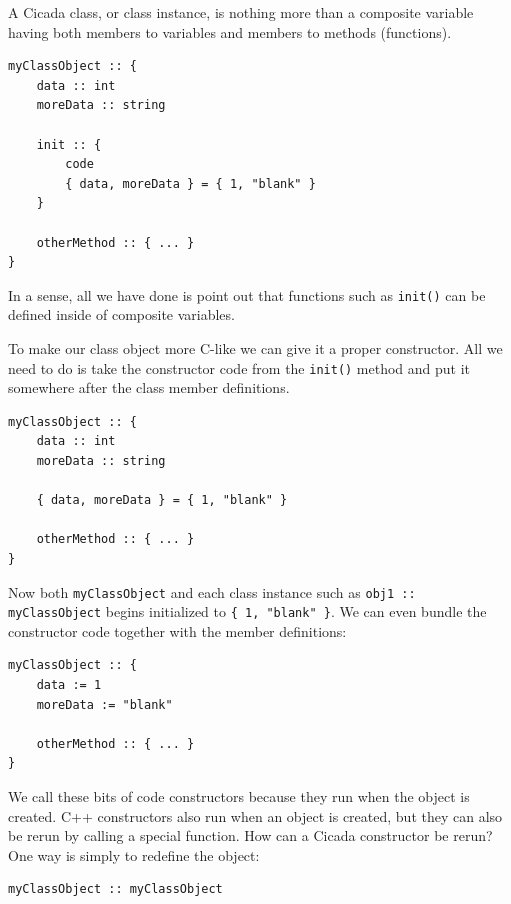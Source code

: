 \documentclass{article}
\newenvironment{code}{
       \begin{list}{}{
               \setlength{\leftmargin}{.4in}
               \setlength{\rightmargin}{0in}
               \setlength{\topsep}{.2in}
       }
       \small
       \item[] }
       { \end{list}   }
\begin{document}
A Cicada class, or class instance, is nothing more than a composite variable having both members to variables and members to methods (functions).

\begin{code} \begin{verbatim}
myClassObject :: {
    data :: int
    moreData :: string
    
    init :: {
        code
        { data, moreData } = { 1, "blank" }
    }
    
    otherMethod :: { ... }
}
\end{verbatim} \end{code}

\noindent In a sense, all we have done is point out that functions such as \verb#init()# can be defined inside of composite variables.

To make our class object more C-like we can give it a proper constructor.  All we need to do is take the constructor code from the \verb#init()# method and put it somewhere after the class member definitions.

\begin{code} \begin{verbatim}
myClassObject :: {
    data :: int
    moreData :: string
    
    { data, moreData } = { 1, "blank" }
    
    otherMethod :: { ... }
}
\end{verbatim} \end{code}

\noindent Now both \verb#myClassObject# and each class instance such as \verb#obj1 :: myClassObject# begins initialized to \verb${ 1, "blank" }$.  We can even bundle the constructor code together with the member definitions:

\begin{code} \begin{verbatim}
myClassObject :: {
    data := 1
    moreData := "blank"
    
    otherMethod :: { ... }
}
\end{verbatim} \end{code}

We call these bits of code constructors because they run when the object is created.  C++ constructors also run when an object is created, but they can also be rerun by calling a special function.  How can a Cicada constructor be rerun?  One way is simply to redefine the object:

\begin{code} \begin{verbatim}
myClassObject :: myClassObject
\end{verbatim} \end{code}
\end{document}
